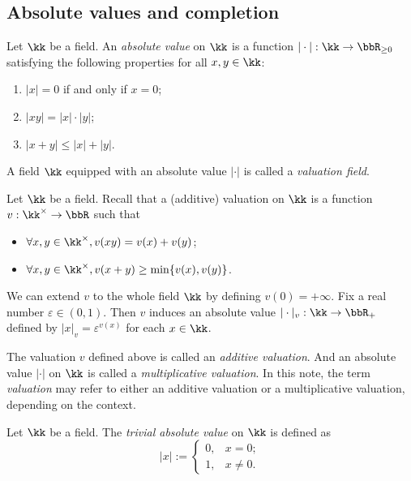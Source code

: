 
\subsection{Absolute values and completion}

    \begin{definition}\label{def:valuation_field}
        Let \(\kk\) be a field.
        An \emph{absolute value} on \(\kk\) is a function \(|\cdot|:\kk\to\bbR_{\ge0}\) satisfying the following properties for all \(x,y\in\kk\):
        \begin{enumerate}
            \item \(|x|=0\) if and only if \(x=0\);
            \item \(|xy|=|x|\cdot|y|\);
            \item \(|x+y|\leq|x|+|y|\).
        \end{enumerate}
        A field \(\kk\) equipped with an absolute value \(|\cdot|\) is called a \emph{valuation field}.
    \end{definition}

    \begin{remark}\label{rmk:additive_and_multiplicative_valuation_on_a_field}
        Let \(\kk\) be a field.
        Recall that a (additive) valuation on \(\kk\) is a function \(v: \kk^\times \to \bbR\) such that
        \begin{itemize}
            \item \(\forall x,y \in \kk^\times, v(xy) = v(x) + v(y)\);
            \item \(\forall x,y \in \kk^\times, v(x + y) \geq \min\{v(x), v(y)\}\).
        \end{itemize}
        We can extend \(v\) to the whole field \(\kk\) by defining \(v(0) = +\infty\).
        Fix a real number \(\varepsilon \in (0,1)\).
        Then \(v\) induces an absolute value \(|\cdot|_v: \kk \to \bbR_+\) defined by \(|x|_v = \varepsilon^{v(x)}\) for each \(x \in \kk\).

        The valuation \(v\) defined above is called an \emph{additive valuation}.
        And an absolute value \(|\cdot|\) on \(\kk\) is called a \emph{multiplicative valuation}.
        In this note, the term \emph{valuation} may refer to either an additive valuation or a multiplicative valuation, depending on the context.
    \end{remark}

    \begin{example}\label{eg:trivial_absolute_value_on_any_fields}
        Let \(\kk\) be a field.
        The \emph{trivial absolute value} on \(\kk\) is defined as
        \[ |x| := \begin{cases}
            0, & x = 0; \\
            1, & x \neq 0.
        \end{cases} \]
    \end{example}

